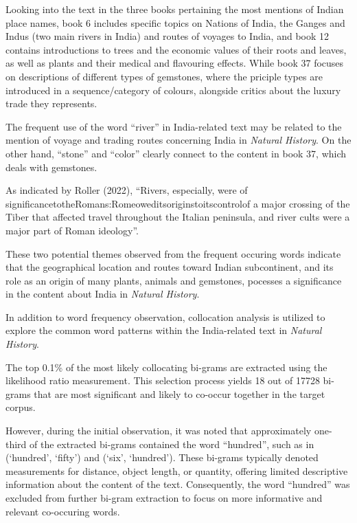 \documentclass[
  12pt,
]{article}
\begin{document}
Looking into the text in the three books pertaining the most mentions of
Indian place names, book 6 includes specific topics on Nations of India,
the Ganges and Indus (two main rivers in India) and routes of voyages to
India, and book 12 contains introductions to trees and the economic
values of their roots and leaves, as well as plants and their medical
and flavouring effects. While book 37 focuses on descriptions of
different types of gemstones, where the priciple types are introduced in
a sequence/category of colours, alongside critics about the luxury trade
they represents.

The frequent use of the word ``river'' in India-related text may be
related to the mention of voyage and trading routes concerning India in
\emph{Natural History}. On the other hand, ``stone'' and ``color''
clearly connect to the content in book 37, which deals with gemstones.

As indicated by Roller (2022), ``Rivers, especially, were of
significancetotheRomans:Romeoweditsoriginstoitscontrolof a major
crossing of the Tiber that affected travel throughout the Italian
peninsula, and river cults were a major part of Roman ideology''.

These two potential themes observed from the frequent occuring words
indicate that the geographical location and routes toward Indian
subcontinent, and its role as an origin of many plants, animals and
gemstones, pocesses a significance in the content about India in
\emph{Natural History}.

In addition to word frequency observation, collocation analysis is
utilized to explore the common word patterns within the India-related
text in \emph{Natural History}.

The top 0.1\% of the most likely collocating bi-grams are extracted
using the likelihood ratio measurement. This selection process yields 18
out of 17728 bi-grams that are most significant and likely to co-occur
together in the target corpus.

However, during the initial observation, it was noted that approximately
one-third of the extracted bi-grams contained the word ``hundred'', such
as in (`hundred', `fifty') and (`six', `hundred'). These bi-grams
typically denoted measurements for distance, object length, or quantity,
offering limited descriptive information about the content of the text.
Consequently, the word ``hundred'' was excluded from further bi-gram
extraction to focus on more informative and relevant co-occuring words.
\end{document}
